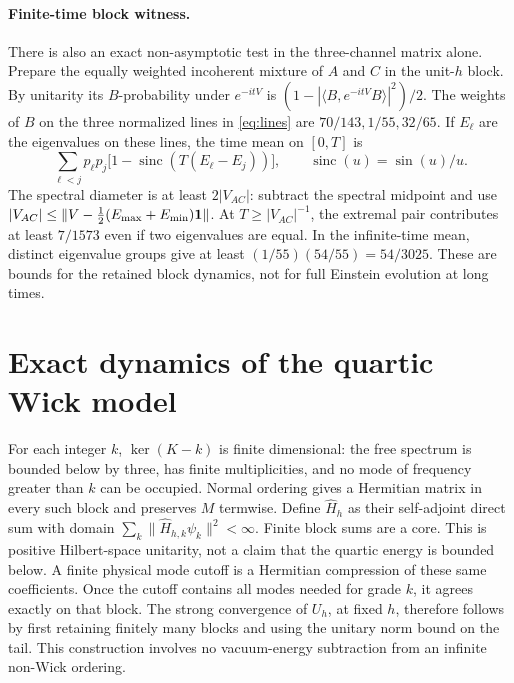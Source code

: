 \documentclass[11pt]{article}
\numberwithin{equation}{section}
\begin{document}
\paragraph{Finite-time block witness.}
There is also an exact non-asymptotic test in the three-channel
matrix alone. Prepare the equally weighted incoherent mixture of
\(A\) and \(C\) in the unit-\(h\) block. By unitarity its
\(B\)-probability under \(e^{-itV}\) is
\((1-|\langle B,e^{-itV}B\rangle|^2)/2\).
The weights of \(B\) on the three normalized lines in
\eqref{eq:lines} are \(70/143,1/55,32/65\).
If \(E_\ell\) are the eigenvalues on these lines, the time mean
on \([0,T]\) is
\[
 \sum_{\ell<j} p_\ell p_j
     \big[1-\operatorname{sinc}(T(E_\ell-E_j))\big],
 \qquad \operatorname{sinc}(u)=\sin(u)/u .
\]
The spectral diameter is at least \(2|V_{AC}|\): subtract the
spectral midpoint and use \(|V_{AC}|\le
\|V-\tfrac12(E_{\max}+E_{\min}){\bf 1}\|\).
At \(T\ge |V_{AC}|^{-1}\), the extremal pair contributes at
least \(7/1573\) even if two eigenvalues are equal.
In the infinite-time mean, distinct eigenvalue groups
give at least \((1/55)(54/55)=54/3025\).
These are bounds for the retained block dynamics, not for
full Einstein evolution at long times.

\section{Exact dynamics of the quartic Wick model}\label{sec:fock}

For each integer \(k\), \(\ker(K-k)\) is finite dimensional:
the free spectrum is bounded below by three, has finite
multiplicities, and no mode of frequency greater than \(k\)
can be occupied. Normal ordering gives a Hermitian matrix
in every such block and preserves \(M\) termwise. Define
\(\widehat H_h\) as their self-adjoint direct sum with domain
\(\sum_k\|\widehat H_{h,k}\psi_k\|^2<\infty\).
Finite block sums are a core. This is positive Hilbert-space
unitarity, not a claim that the quartic energy is bounded below.
A finite physical mode cutoff is a Hermitian compression of
these same coefficients. Once the cutoff contains all modes
needed for grade \(k\), it agrees exactly on that block.
The strong convergence of \(U_h\), at fixed \(h\), therefore
follows by first retaining finitely many blocks and using the
unitary norm bound on the tail. This construction involves no
vacuum-energy subtraction from an infinite non-Wick ordering.
\end{document}
